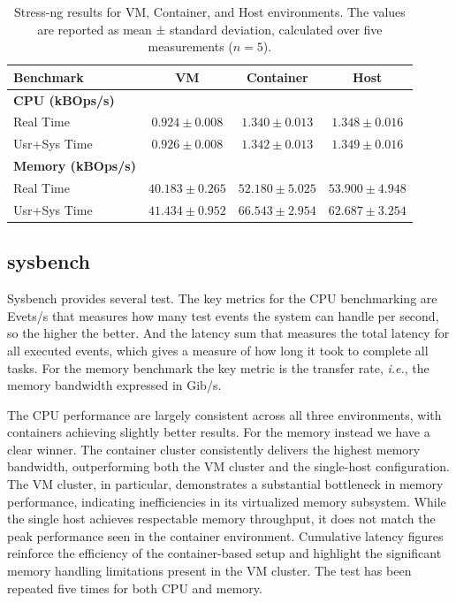 \begin{table}[htbp]
    \centering
    \begin{tabular}{lccc}
    \toprule
    \textbf{Benchmark} & \textbf{VM} & \textbf{Container} & \textbf{Host} \\
    \midrule
    \textbf{CPU (kBOps/s)} & & & \\
    Real Time & $0.924 \pm 0.008$ & $1.340 \pm 0.013$ & $1.348 \pm 0.016$ \\
    Usr+Sys Time & $0.926 \pm 0.008$ & $1.342 \pm 0.013$ & $1.349 \pm 0.016$ \\
    \midrule
    \textbf{Memory (kBOps/s)} & & & \\
    Real Time & $40.183 \pm 0.265$ & $52.180 \pm 5.025$ & $53.900 \pm 4.948$ \\
    Usr+Sys Time & $41.434 \pm 0.952$ & $66.543 \pm 2.954$ & $62.687 \pm 3.254$ \\
    \bottomrule
    \end{tabular}
    \caption{Stress-ng results for VM, Container, and Host environments. The values are reported as mean ± standard deviation, calculated over five measurements ($n = 5$).}
    \label{tab:stress-ng}
\end{table}


\subsection{sysbench}

Sysbench provides several test. The key metrics for the CPU benchmarking are Evets/s that measures how many test events the system can handle per second, so the higher the better. And the latency sum that measures the total latency for all executed events, which gives a measure of how long it took to complete all tasks. For the memory benchmark the key metric is the transfer rate, \textit{i.e.}, the memory bandwidth expressed in Gib/s.

The CPU performance are largely consistent across all three environments, with containers achieving slightly better results. For the memory instead we have a clear winner. The container cluster consistently delivers the highest memory bandwidth, outperforming both the VM cluster and the single-host configuration. The VM cluster, in particular, demonstrates a substantial bottleneck in memory performance, indicating inefficiencies in its virtualized memory subsystem. While the single host achieves respectable memory throughput, it does not match the peak performance seen in the container environment. Cumulative latency figures reinforce the efficiency of the container-based setup and highlight the significant memory handling limitations present in the VM cluster.
The test has been repeated five times for both CPU and memory. 

